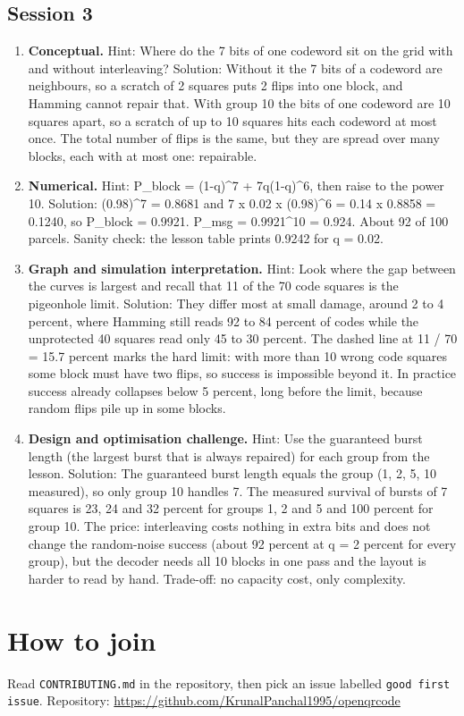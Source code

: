 \documentclass[11pt,a4paper]{article}
\begin{document}
\subsection*{Session 3}
\begin{enumerate}[nosep]
\item \textbf{Conceptual.} Hint: Where do the 7 bits of one codeword sit on the grid with and without interleaving? Solution: Without it the 7 bits of a codeword are neighbours, so a scratch of 2 squares puts 2 flips into one block, and Hamming cannot repair that. With group 10 the bits of one codeword are 10 squares apart, so a scratch of up to 10 squares hits each codeword at most once. The total number of flips is the same, but they are spread over many blocks, each with at most one: repairable.
\item \textbf{Numerical.} Hint: P\_block = (1-q)\textasciicircum{}7 + 7q(1-q)\textasciicircum{}6, then raise to the power 10. Solution: (0.98)\textasciicircum{}7 = 0.8681 and 7 x 0.02 x (0.98)\textasciicircum{}6 = 0.14 x 0.8858 = 0.1240, so P\_block = 0.9921. P\_msg = 0.9921\textasciicircum{}10 = 0.924. About 92 of 100 parcels. Sanity check: the lesson table prints 0.9242 for q = 0.02.
\item \textbf{Graph and simulation interpretation.} Hint: Look where the gap between the curves is largest and recall that 11 of the 70 code squares is the pigeonhole limit. Solution: They differ most at small damage, around 2 to 4 percent, where Hamming still reads 92 to 84 percent of codes while the unprotected 40 squares read only 45 to 30 percent. The dashed line at 11 / 70 = 15.7 percent marks the hard limit: with more than 10 wrong code squares some block must have two flips, so success is impossible beyond it. In practice success already collapses below 5 percent, long before the limit, because random flips pile up in some blocks.
\item \textbf{Design and optimisation challenge.} Hint: Use the guaranteed burst length (the largest burst that is always repaired) for each group from the lesson. Solution: The guaranteed burst length equals the group (1, 2, 5, 10 measured), so only group 10 handles 7. The measured survival of bursts of 7 squares is 23, 24 and 32 percent for groups 1, 2 and 5 and 100 percent for group 10. The price: interleaving costs nothing in extra bits and does not change the random-noise success (about 92 percent at q = 2 percent for every group), but the decoder needs all 10 blocks in one pass and the layout is harder to read by hand. Trade-off: no capacity cost, only complexity.
\end{enumerate}

\section{How to join}
Read \texttt{CONTRIBUTING.md} in the repository, then pick an issue labelled \texttt{good first issue}. Repository: \url{https://github.com/KrunalPanchal1995/openqrcode}
\end{document}
